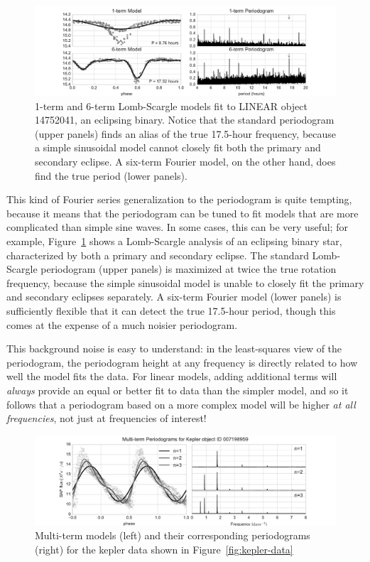 \documentclass[preprint]{aastex}
\newcommand{\fig}[1]{Figure~\ref{fig:#1}}
\newcommand{\figlabel}[1]{\label{fig:#1}}
\begin{document}
\begin{figure}[ht]
  \centering
  \includegraphics[width=\textwidth]{fig23_binary_multiterm}
  \caption{1-term and 6-term Lomb-Scargle models fit to LINEAR object
    14752041, an eclipsing binary. Notice that the standard periodogram
    (upper panels) finds an alias of the true 17.5-hour frequency,
    because a simple sinusoidal model cannot closely fit both the primary
    and secondary eclipse. A six-term Fourier model, on
    the other hand, does find the true period (lower panels).
    \figlabel{binary-multiterm}}
\end{figure}

This kind of Fourier series generalization to the periodogram is quite
tempting, because it means that the periodogram can be tuned to fit models
that are more complicated than simple sine waves.
In some cases, this can be very useful; for example, \fig{binary-multiterm}
shows a Lomb-Scargle analysis of an eclipsing binary star, characterized by
both a primary and secondary eclipse.
The standard Lomb-Scargle periodogram (upper panels) is maximized at twice the true rotation
frequency, because the simple sinusoidal model is unable to closely fit the
primary and secondary eclipses separately.
A six-term Fourier model (lower panels) is sufficiently flexible that it can
detect the true 17.5-hour period, though this comes at the expense of a much
noisier periodogram.

This background noise is easy to understand: in the least-squares view of the
periodogram, the periodogram height at any frequency is directly related to
how well the model fits the data.
For linear models, adding additional terms will {\it always} provide an
equal or better fit to data than the simpler model, and so it follows that
a periodogram based on a more complex model will be higher
{\it at all frequencies}, not just at frequencies of interest!

\begin{figure}[ht]
  \centering
  \includegraphics[width=\textwidth]{fig21_kepler_multiterm}
  \caption{Multi-term models (left) and their corresponding periodograms (right)
    for the kepler data shown in \fig{kepler-data}
    \figlabel{kepler-multiterm}}
\end{figure}
\end{document}
